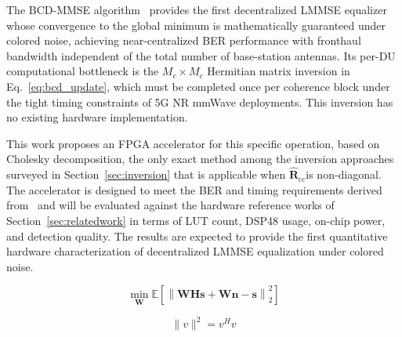 \documentclass[12pt]{article}
\begin{document}
The BCD-MMSE algorithm~\cite{zhao2025jsac} provides the
first decentralized LMMSE equalizer whose convergence to the global minimum is mathematically guaranteed under colored noise,
achieving near-centralized BER performance with fronthaul bandwidth
independent of the total number of base-station antennas. Its per-DU
computational bottleneck is the $M_c \times M_c$ Hermitian matrix
inversion in Eq.~\eqref{eq:bcd_update}, which must be completed once
per coherence block under the tight timing constraints of 5G NR mmWave
deployments. This inversion has no existing hardware implementation.




This work proposes an FPGA accelerator for this specific operation, based on Cholesky decomposition, the only exact method among the inversion approaches surveyed in Section~\ref{sec:inversion} that is applicable when $\hat{\mathbf{R}}_{cc}$is non-diagonal. The
accelerator is designed to meet the BER and timing requirements derived
from~\cite{zhao2025jsac} and will be evaluated against the hardware
reference works of Section~\ref{sec:relatedwork} in terms of LUT count,
DSP48 usage, on-chip power, and detection quality. The results are expected to provide the first quantitative hardware characterization of decentralized LMMSE equalization under colored noise.


\begin{equation}
\min_{\mathbf{W}}
\mathbb{E}
\left[
\left\|\mathbf{W}\mathbf{Hs}+ \mathbf{W}\mathbf{n}-\mathbf{s}\right\|_2^2
\right]
\label{eq:lmmse_opt}
\end{equation}

\begin{equation}
    \lVert \textit{v} \rVert^2 = \textit{v}^H \textit{v}

\end{equation}




\end{document}

